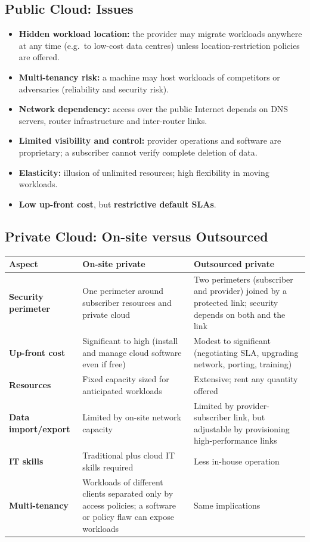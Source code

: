 \subsection{Public Cloud: Issues}
\begin{itemize}[leftmargin=*]
  \item \textbf{Hidden workload location:} the provider may migrate workloads anywhere at any time
        (e.g.\ to low-cost data centres) unless location-restriction policies are offered.
  \item \textbf{Multi-tenancy risk:} a machine may host workloads of competitors or adversaries
        (reliability and security risk).
  \item \textbf{Network dependency:} access over the public Internet depends on DNS servers, router
        infrastructure and inter-router links.
  \item \textbf{Limited visibility and control:} provider operations and software are proprietary; a
        subscriber cannot verify complete deletion of data.
  \item \textbf{Elasticity:} illusion of unlimited resources; high flexibility in moving workloads.
  \item \textbf{Low up-front cost}, but \textbf{restrictive default SLAs}.
\end{itemize}

\subsection{Private Cloud: On-site versus Outsourced}
\begin{center}
\begin{tabularx}{\textwidth}{>{\bfseries}lXX}
\toprule
Aspect & On-site private & Outsourced private\\
\midrule
Security perimeter & One perimeter around subscriber resources and private cloud & Two perimeters
(subscriber and provider) joined by a protected link; security depends on both and the link\\
Up-front cost & Significant to high (install and manage cloud software even if free) & Modest to
significant (negotiating SLA, upgrading network, porting, training)\\
Resources & Fixed capacity sized for anticipated workloads & Extensive; rent any quantity offered\\
Data import/export & Limited by on-site network capacity & Limited by provider-subscriber link, but
adjustable by provisioning high-performance links\\
IT skills & Traditional plus cloud IT skills required & Less in-house operation\\
Multi-tenancy & Workloads of different clients separated only by access policies; a software or policy
flaw can expose workloads & Same implications\\
\bottomrule
\end{tabularx}
\end{center}

